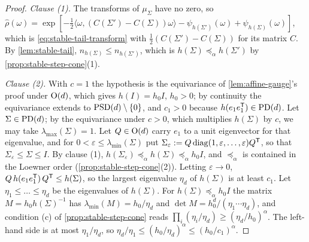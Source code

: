 \begin{proof}
\leanok
\emph{Clause (1).} The transforms of $\mu_\Sigma$ have no zero, so
$\widehat\rho(\omega) = \exp[-\tfrac12\langle\omega,(C(\Sigma') - C(\Sigma))\omega\rangle
- \psi_{h(\Sigma')}(\omega) + \psi_{h(\Sigma)}(\omega)]$, which is \ref{eq:stable-tail-transform} with
$\tfrac12(C(\Sigma') - C(\Sigma))$ for its matrix $C$. By \ref{lem:stable-tail}, $n_{h(\Sigma)} \le n_{h(\Sigma')}$,
which is $h(\Sigma) \preceq_\alpha h(\Sigma')$ by \ref{prop:stable-step-cone}(1).

\emph{Clause (2).} With $c = 1$ the hypothesis is the equivariance of \ref{lem:affine-gauge}'s proof
under $\mathrm{O}(d)$, which gives $h(I) = h_0I$, $h_0 > 0$; by continuity the equivariance extends to
$\mathrm{PSD}(d) \setminus \{0\}$, and $c_1 > 0$ because $h(e_1e_1^{\mathsf{T}}) \in \mathrm{PD}(d)$. Let $\Sigma \in \mathrm{PD}(d)$;
by the equivariance under $c > 0$, which multiplies $h(\Sigma)$ by $c$, we may take
$\lambda_{\max}(\Sigma) = 1$. Let $Q \in \mathrm{O}(d)$ carry $e_1$ to a unit eigenvector for that
eigenvalue, and for $0 < \varepsilon \le \lambda_{\min}(\Sigma)$ put
$\Sigma_\varepsilon := Q\operatorname{diag}(1,\varepsilon,\dots,\varepsilon)Q^{\mathsf{T}}$, so that
$\Sigma_\varepsilon \le \Sigma \le I$. By clause (1), $h(\Sigma_\varepsilon) \preceq_\alpha h(\Sigma)
\preceq_\alpha h_0I$, and $\preceq_\alpha$ is contained in the Loewner order
(\ref{prop:stable-step-cone}(2)). Letting $\varepsilon \to 0$,
$Q\,h(e_1e_1^{\mathsf{T}})\,Q^{\mathsf{T}} \le h(\Sigma)$, so the largest eigenvalue $\eta_d$ of $h(\Sigma)$ is at
least $c_1$. Let $\eta_1 \le \dots \le \eta_d$ be the eigenvalues of $h(\Sigma)$. For
$h(\Sigma) \preceq_\alpha h_0I$ the matrix $M = h_0h(\Sigma)^{-1}$ has $\lambda_{\min}(M) = h_0/\eta_d$ and
$\det M = h_0^d/(\eta_1\cdots\eta_d)$, and condition (c) of \ref{prop:stable-step-cone} reads
$\prod_i(\eta_i/\eta_d) \ge (\eta_d/h_0)^\alpha$. The left-hand side is at most $\eta_1/\eta_d$, so
$\eta_d/\eta_1 \le (h_0/\eta_d)^\alpha \le (h_0/c_1)^\alpha$.


\end{proof}
